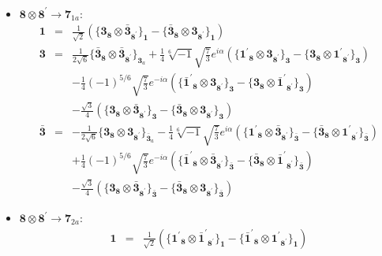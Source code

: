 \documentclass[english]{article}
\newcommand{\subcg}[3]{\big\{ {#1}\otimes{#2}\big\}^{}_{#3}}
\newcommand{\rep}[1]{\mathbf{#1}}
\begin{document}
\begin{itemize}
\begin{eqnarray*}
\end{eqnarray*}
\item $\rep{8}\otimes\rep{8^{\prime}}\to\rep{7}_{1a}$:
\begin{eqnarray*}
\rep{1} &=& \frac{1}{\sqrt{2}}\left(\subcg{\rep{3}_{\rep{8}}}{\rep{\bar{3}}_{\rep{8^{\prime}}}}{\rep{1}}-\subcg{\rep{\bar{3}}_{\rep{8}}}{\rep{3}_{\rep{8^{\prime}}}}{\rep{1}}\right)
\\
\rep{3} &=& \frac{1}{2 \sqrt{6}}\subcg{\rep{\bar{3}}_{\rep{8}}}{\rep{\bar{3}}_{\rep{8^{\prime}}}}{\rep{3}_{a}}+\frac{1}{4} \sqrt[6]{-1} \sqrt{\frac{7}{3}} e^{i \alpha }\left(\subcg{\rep{1^{\prime}}_{\rep{8}}}{\rep{3}_{\rep{8^{\prime}}}}{\rep{3}}-\subcg{\rep{3}_{\rep{8}}}{\rep{1^{\prime}}_{\rep{8^{\prime}}}}{\rep{3}}\right) \\ 
 & & -\frac{1}{4} (-1)^{5/6} \sqrt{\frac{7}{3}} e^{-i \alpha }\left(\subcg{\rep{\bar{1}^{\prime}}_{\rep{8}}}{\rep{3}_{\rep{8^{\prime}}}}{\rep{3}}-\subcg{\rep{3}_{\rep{8}}}{\rep{\bar{1}^{\prime}}_{\rep{8^{\prime}}}}{\rep{3}}\right) \\ 
 & & -\frac{\sqrt{3}}{4}\left(\subcg{\rep{3}_{\rep{8}}}{\rep{\bar{3}}_{\rep{8^{\prime}}}}{\rep{3}}-\subcg{\rep{\bar{3}}_{\rep{8}}}{\rep{3}_{\rep{8^{\prime}}}}{\rep{3}}\right)
\\
\rep{\bar{3}} &=& -\frac{1}{2 \sqrt{6}}\subcg{\rep{3}_{\rep{8}}}{\rep{3}_{\rep{8^{\prime}}}}{\rep{\bar{3}}_{a}}-\frac{1}{4} \sqrt[6]{-1} \sqrt{\frac{7}{3}} e^{i \alpha }\left(\subcg{\rep{1^{\prime}}_{\rep{8}}}{\rep{\bar{3}}_{\rep{8^{\prime}}}}{\rep{\bar{3}}}-\subcg{\rep{\bar{3}}_{\rep{8}}}{\rep{1^{\prime}}_{\rep{8^{\prime}}}}{\rep{\bar{3}}}\right) \\ 
 & & +\frac{1}{4} (-1)^{5/6} \sqrt{\frac{7}{3}} e^{-i \alpha }\left(\subcg{\rep{\bar{1}^{\prime}}_{\rep{8}}}{\rep{\bar{3}}_{\rep{8^{\prime}}}}{\rep{\bar{3}}}-\subcg{\rep{\bar{3}}_{\rep{8}}}{\rep{\bar{1}^{\prime}}_{\rep{8^{\prime}}}}{\rep{\bar{3}}}\right) \\ 
 & & -\frac{\sqrt{3}}{4}\left(\subcg{\rep{3}_{\rep{8}}}{\rep{\bar{3}}_{\rep{8^{\prime}}}}{\rep{\bar{3}}}-\subcg{\rep{\bar{3}}_{\rep{8}}}{\rep{3}_{\rep{8^{\prime}}}}{\rep{\bar{3}}}\right)
\end{eqnarray*}
\item $\rep{8}\otimes\rep{8^{\prime}}\to\rep{7}_{2a}$:
\begin{eqnarray*}
\rep{1} &=& \frac{1}{\sqrt{2}}\left(\subcg{\rep{1^{\prime}}_{\rep{8}}}{\rep{\bar{1}^{\prime}}_{\rep{8^{\prime}}}}{\rep{1}}-\subcg{\rep{\bar{1}^{\prime}}_{\rep{8}}}{\rep{1^{\prime}}_{\rep{8^{\prime}}}}{\rep{1}}\right)

\end{eqnarray*}
\end{itemize}
\end{document}
